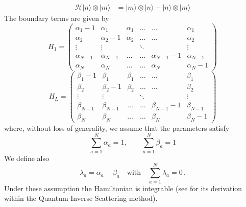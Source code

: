 \documentclass[11pt]{article}
\numberwithin{equation}{section}
\numberwithin{equation}{subsection}
\begin{document}
\begin{equation}
	\begin{split}
		\mathcal{H}|n\rangle\otimes   |m\rangle&=|m\rangle \otimes |n\rangle-|n\rangle \otimes|m\rangle
	\end{split}
\end{equation}
The boundary terms are given by 
\begin{equation}
	H_{1}=\begin{pmatrix}
		\alpha_{1}-1&\alpha_{1}&\alpha_{1}&\ldots&\ldots&\alpha_{1}\\
		\alpha_{2}&\alpha_{2}-1&\alpha_{2}&\ldots&\ldots&\alpha_{2}\\
		\vdots&\vdots& &\ddots& &\vdots\\
		\alpha_{N-1}&\alpha_{N-1}&\ldots&\ldots&\alpha_{N-1}-1&\alpha_{N-1}\\
		\alpha_{N}&\alpha_{N}&\ldots&\ldots&\alpha_{N}&\alpha_{N}-1
	\end{pmatrix}
\end{equation}
\begin{equation}
	H_{L}=\begin{pmatrix}
		\beta_{1}-1&\beta_{1}&\beta_{1}&\ldots&\ldots&\beta_{1}\\
		\beta_{2}&\beta_{2}-1&\beta_{2}&\ldots&\ldots&\beta_{2}\\
		\vdots&\vdots& &\ddots& &\vdots\\
		\beta_{N-1}&\beta_{N-1}&\ldots&\ldots&\beta_{N-1}-1&\beta_{N-1}\\
		\beta_{N}&\beta_{N}&\ldots&\ldots&\beta_{N}&\beta_{N}-1
	\end{pmatrix}
\end{equation}
where, without loss of generality,  we assume that the parameters satisfy
\begin{equation}\label{ratesConditions}
	\sum_{a=1}^{N}\alpha_{a}=1,\qquad\sum_{a=1}^{N}\beta_{a}=1
\end{equation} 
We define also 
\begin{equation}\label{lambdaConditions}
	\lambda_{a}=\alpha_{a}-\beta_{a}\quad\text{with}\quad \sum_{a=1}^{N}\lambda_{a}=0\,.
\end{equation}
Under these assumption the Hamiltonian is integrable (see \cite{vanicat2017exact} for its derivation within the Quantum Inverse Scattering method). \\
\end{document}
